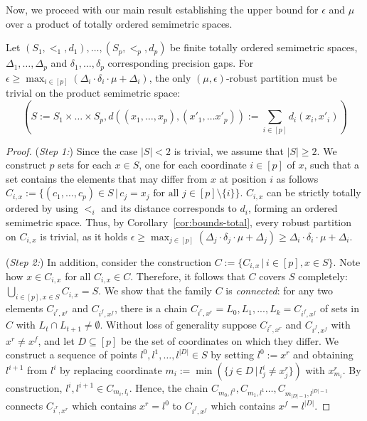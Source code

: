 Now, we proceed with our main result establishing the upper bound for $\epsilon$ and $\mu$ over a product of totally ordered semimetric spaces.

\begin{theorem}
    \label{thm:product-robust}
    Let $(S_1, <_1, d_1), \dots, (S_p, <_p, d_p)$ be finite totally ordered semimetric spaces, $\Delta_1, \dots, \Delta_p$ and $\delta_1, \dots, \delta_p$ corresponding precision gaps. For $\epsilon \geq \max_{i \in [p]}(\Delta_i \cdot \delta_i \cdot \mu + \Delta_i)$, the only $(\mu,\epsilon)$-robust partition must be trivial on the product semimetric space:
    $$(S := S_1 \times\dots \times S_p, d((x_1,\dots,x_p), (x'_1, \dots x'_p)) := \sum_{i \in [p]} d_i (x_i, x'_i))$$
\end{theorem}
\begin{proof}
    (\emph{Step 1:})
    Since the case $|S| < 2$ is trivial, we assume that $|S| \geq 2$.
    We construct $p$ sets for each $x \in S$, one for each coordinate $i \in [p]$ of $x$,
    such that a set contains the elements that
    may differ from $x$ at position $i$ as follows $C_{i,x} := \{(c_1, \dots, c_p) \in S\,|\,c_j = x_j \text{ for all } j \in [p] \setminus \{i\}\}$. $C_{i,x}$ can be strictly totally ordered by using $<_i$ and its distance corresponds to $d_i$, forming an ordered semimetric space. Thus, by Corollary~\ref{cor:bounds-total}, every robust partition on $C_{i,x}$ is trivial, as it holds $\epsilon \geq \max_{j \in [p]}(\Delta_j \cdot \delta_j \cdot \mu + \Delta_j) \geq \Delta_i \cdot \delta_i \cdot \mu + \Delta_i$. 

    (\emph{Step 2:})
    In addition, consider the construction $C := \{C_{i,x}\,|\,i\in[p],x\in S\}$. Note how $x \in C_{i,x}$ for all $C_{i,x} \in C$. Therefore, it follows that $C$ covers $S$ completely: $\bigcup_{i \in [p], x \in S} C_{i,x} = S$. We show that the family $C$ is \emph{connected}: for any two elements $C_{i^r,x^r}$ and $C_{i^f,x^f}$, there is a chain  $C_{i^r,x^r}= L_0,L_1,...,L_k=C_{i^f,x^f}$ of sets in $C$ with $L_t \cap L_{t+1} \neq \emptyset$. 
    Without loss of generality suppose $C_{i^r,x^r}$ and $C_{i^f,x^f}$ with $x^r \neq x^f$,
    and let $D \subseteq [p]$ be the set of coordinates on which they differ. 
    We construct a sequence of points $l^0,l^1, \dots, l^{|D|} \in S$ by setting $l^0 := x^r$ and obtaining $l^{i + 1}$ from $l^{i}$  by replacing coordinate $m_i := \min(\{j \in D\,|\,l^i_j \neq x^r_j\})$ with $x^r_{m_i}$. By construction, $l^i,l^{i+1} \in C_{m_i, l_i}$. Hence, the chain $C_{m_0,l^0}, C_{m_1,l^1}\dots,C_{m_{|D| - 1}, l^{|D| - 1}}$ connects $C_{i^r,x^r}$ which contains $x^r = l^0$ to $C_{i^f,x^f}$ which contains $x^f = l^{|D|}$.


\end{proof}
